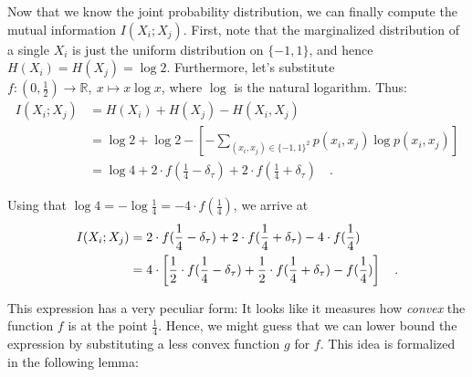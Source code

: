 \documentclass[../../main.tex]{subfiles}
\begin{document}
Now that we know the joint probability distribution, we can finally compute the mutual information $I(X_i; X_j)$. First, note that the marginalized distribution of a single $X_i$ is just the uniform distribution on $\{-1, 1\}$, and hence $H(X_i) = H(X_j) = \log 2$. Furthermore, let's substitute $f: (0, \frac{1}{2}) \to \mathbb{R}, \ x \mapsto x \log x$, where $\log$ is the natural logarithm. Thus:
\begin{align*}
    I(X_i; X_j) &= H(X_i) + H(X_j) - H(X_i, X_j) \\
    &= \log 2 + \log 2 - \left[ - \sum_{(x_i, x_j) \in \{-1, 1\}^2} p(x_i, x_j) \log p(x_i, x_j) \right] \\
    &= \log 4 + 2 \cdot f(\frac{1}{4} - \delta_\tau) + 2 \cdot f(\frac{1}{4} + \delta_\tau) \quad .
\end{align*}

Using that $\log 4 = - \log \frac{1}{4} = -4 \cdot f(\frac{1}{4})$, we arrive at
\begin{align}
    I(X_i; X_j) &= 2 \cdot f(\frac{1}{4} - \delta_\tau) + 2 \cdot f(\frac{1}{4} + \delta_\tau) -4 \cdot f(\frac{1}{4}) \notag \\
    &= 4 \cdot \left[ \frac{1}{2} \cdot f(\frac{1}{4} - \delta_\tau) + \frac{1}{2} \cdot f(\frac{1}{4} + \delta_\tau) - f(\frac{1}{4}) \right] \quad . \label{eq:mutual_information_in_terms_of_f}
\end{align}

This expression has a very peculiar form: It looks like it measures how \emph{convex} the function $f$ is at the point $\frac{1}{4}$. Hence, we might guess that we can lower bound the expression by substituting a less convex function $g$ for $f$. This idea is formalized in the following lemma:
\end{document}
